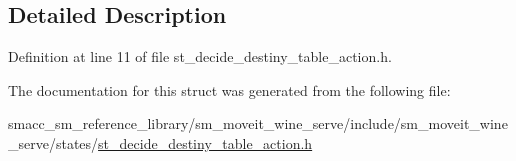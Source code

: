\subsection{Detailed Description}


Definition at line 11 of file st\+\_\+decide\+\_\+destiny\+\_\+table\+\_\+action.\+h.



The documentation for this struct was generated from the following file\+:\begin{DoxyCompactItemize}
\item 
smacc\+\_\+sm\+\_\+reference\+\_\+library/sm\+\_\+moveit\+\_\+wine\+\_\+serve/include/sm\+\_\+moveit\+\_\+wine\+\_\+serve/states/\hyperlink{st__decide__destiny__table__action_8h}{st\+\_\+decide\+\_\+destiny\+\_\+table\+\_\+action.\+h}\end{DoxyCompactItemize}
